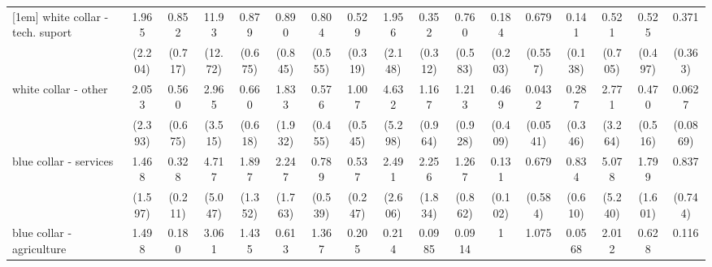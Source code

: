 {\begin{tabular}{l*{16}{c}}
[1em]
white collar - tech. suport&       1.965         &       0.852         &       11.93\sym{*}  &       0.879         &       0.890         &       0.804         &       0.529         &       1.956         &       0.352         &       0.760         &       0.184         &       0.679         &       0.141\sym{*}  &       0.521         &       0.525         &       0.371         \\
                    &     (2.204)         &     (0.717)         &     (12.72)         &     (0.675)         &     (0.845)         &     (0.555)         &     (0.319)         &     (2.148)         &     (0.312)         &     (0.583)         &     (0.203)         &     (0.557)         &     (0.138)         &     (0.705)         &     (0.497)         &     (0.363)         \\
[1em]
white collar - other&       2.053         &       0.560         &       2.965         &       0.660         &       1.833         &       0.576         &       1.007         &       4.632         &       1.167         &       1.213         &       0.469         &      0.0432\sym{*}  &       0.287         &       2.771         &       0.470         &      0.0627\sym{*}  \\
                    &     (2.393)         &     (0.675)         &     (3.515)         &     (0.618)         &     (1.932)         &     (0.455)         &     (0.545)         &     (5.298)         &     (0.964)         &     (0.928)         &     (0.409)         &    (0.0541)         &     (0.346)         &     (3.264)         &     (0.516)         &    (0.0869)         \\
[1em]
blue collar - services&       1.468         &       0.328         &       4.717         &       1.897         &       2.247         &       0.789         &       0.537         &       2.491         &       2.256         &       1.267         &       0.131\sym{**} &       0.679         &       0.834         &       5.078         &       1.799         &       0.837         \\
                    &     (1.597)         &     (0.211)         &     (5.047)         &     (1.352)         &     (1.763)         &     (0.539)         &     (0.247)         &     (2.606)         &     (1.834)         &     (0.862)         &     (0.102)         &     (0.584)         &     (0.610)         &     (5.240)         &     (1.601)         &     (0.744)         \\
[1em]
blue collar - agriculture&       1.498         &       0.180         &       3.061         &       1.435         &       0.613         &       1.367         &       0.205         &       0.214         &      0.0985         &      0.0914\sym{*}  &           1         &       1.075         &      0.0568\sym{*}  &       2.012         &       0.628         &       0.116         \\

\end{tabular}}
